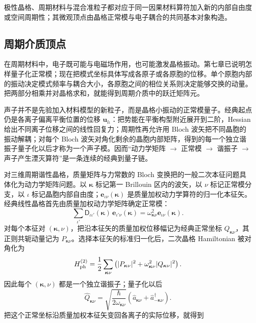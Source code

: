 极性晶格、周期材料与混合准粒子都对应于同一因果材料算符加入新的内部自由度或空间周期性；其微观顶点由晶格正常模与电子耦合的共同基本对象构造。

\subsection{周期介质顶点}\label{chap:feqo-structured-media}
在周期材料中，电子既可能与电磁场作用，也可能激发晶格振动。第七章已说明怎样量子化正常模；现在把模式坐标具体写成各原子或各原胞的位移。单个原胞内部的振动决定模式频率与耦合大小，各原胞之间的相位关系则决定能够交换的动量。把两部分相乘并对晶格求和，就能得到周期介质中的跃迁矩阵元。

声子并不是先验加入材料模型的新粒子，而是晶格小振动的正常模量子。经典起点仍是各离子偏离平衡位置的位移 $\mathbf u_{l\iota}$：把势能在平衡构型附近展开到二阶，Hessian 给出不同离子位移之间的线性回复力；周期性再允许用 Bloch 波矢把不同晶胞的振动解耦；对每个 Bloch 波矢对角化剩余的晶胞内部矩阵，得到的每一个独立谐振子量子化以后才称为一个声子模。因而“动力学矩阵 $\to$ 正常模 $\to$ 谐振子 $\to$ 声子产生湮灭算符”是一条连续的经典到量子链。

对三维周期谐性晶格，质量矩阵与力常数的 Bloch 变换把的一般二次本征问题具体化为动力学矩阵问题。以 $\boldsymbol\kappa$ 标记第一 Brillouin 区内的波矢，以 $\nu$ 标记正常模分支，以 $\iota$ 标记晶胞内部自由度；$\mathbf e_{\iota\nu}(\boldsymbol\kappa)$ 是质量加权动力学算符的归一化本征矢。经典线性晶格首先由质量加权动力学矩阵确定正常模：
\begin{equation}
\boxed{
\sum_{\iota'}\mathsf D_{\iota\iota'}(\boldsymbol\kappa)
\,\mathbf e_{\iota'\nu}(\boldsymbol\kappa)
=\omega_{\boldsymbol\kappa\nu}^2
\mathbf e_{\iota\nu}(\boldsymbol\kappa).}
\label{eq:phonon_normal_mode_eigenproblem}
\end{equation}
对每个本征对 $(\boldsymbol\kappa,\nu)$，把沿本征矢的质量加权位移幅记为经典正常坐标 $Q_{\boldsymbol\kappa\nu}$，其正则共轭动量记为 $P_{\boldsymbol\kappa\nu}$。选择本征矢的标准归一化后，二次晶格 Hamiltonian 被对角化为
\begin{equation*}
H_{\rm ph}^{(2)}
=\frac12\sum_{\boldsymbol\kappa\nu}
\left(|P_{\boldsymbol\kappa\nu}|^2
+\omega_{\boldsymbol\kappa\nu}^2|Q_{\boldsymbol\kappa\nu}|^2\right).
\end{equation*}
因此每个 $(\boldsymbol\kappa,\nu)$ 都是一个独立谐振子；量子化以后
\begin{equation*}
\hat Q_{\boldsymbol\kappa\nu}
=\sqrt{\frac{\hbar}{2\omega_{\boldsymbol\kappa\nu}}}
\left(\hat a_{\boldsymbol\kappa\nu}
+\hat a_{-\boldsymbol\kappa\nu}^{\dagger}\right).
\end{equation*}
把这个正常坐标沿质量加权本征矢变回各离子的实际位移，就得到


